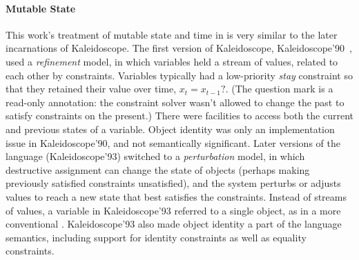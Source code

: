 \paragraph{Mutable State}
This work's treatment of mutable state and time in \langname is very
similar to the later incarnations of Kaleidoscope. The first version
of Kaleidoscope, Kaleidoscope'90~\cite{freeman-benson-iccl-1992}, used
a \emph{refinement} model, in which variables held a stream of values,
related to each other by constraints.  Variables typically had a
low-priority \emph{stay} constraint so that they retained their value
over time, \eg \mbox{$x_t = x_{t-1}?$}.  (The question mark is a
read-only annotation: the constraint solver wasn't allowed to change
the past to satisfy constraints on the present.)  There were
facilities to access both the current and previous states of a
variable.  Object identity was only an implementation issue in
Kaleidoscope'90, and not semantically significant.
Later versions of the language (\eg Kaleidoscope'93)
\cite{lopez-ecoop-1994,lopez-oopsla-1994} switched to a
\emph{perturbation} model, in which destructive assignment can change
the state of objects (perhaps making previously satisfied constraints
unsatisfied), and the system perturbs or adjusts values to reach a new
state that best satisfies the constraints. Instead of streams of
values, a variable in Kaleidoscope'93 referred to a single object, as
in a more conventional \DIFdelbegin {}\DIFdelend \DIFaddbegin {}\DIFaddend .  Kaleidoscope'93 also made object
identity a part of the language semantics, including support for
identity constraints as well as equality constraints.





